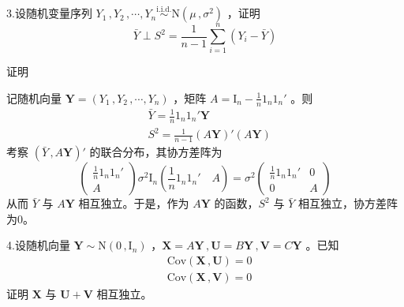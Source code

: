 \documentclass[12pt,hyperref,]{ctexart}
\begin{document}
\vspace{3em}

\kaishu

3.设随机变量序列
\(Y_1\, ,Y_2\, ,\cdots ,Y_n \overset{\mathrm{i.i.d.}}{\sim} \mathrm{N}(\mu\, ,\sigma^2)\)
，证明 \begin{equation*}
\bar{Y}\perp S^2=\frac{1}{n-1}\sum_{i=1}^n\left(Y_i-\bar{Y}\right)
\end{equation*}

\vspace{1em}

\heiti

证明

\songti

记随机向量 \(\boldsymbol{Y}=(Y_1\, ,Y_2\, ,\cdots ,Y_n)\) ，矩阵
\(A=\mathrm{I}_n-\frac 1n1_n1_n'\) 。则 \begin{equation*}
\begin{aligned}
& \bar{Y}=\frac 1n1_n1_n' \boldsymbol{Y} \\
& S^2=\frac{1}{n-1}(A\boldsymbol{Y})'(A\boldsymbol{Y})
\end{aligned}
\end{equation*}考察 \((\bar{Y}\, ,A\boldsymbol{Y})'\)
的联合分布，其协方差阵为 \begin{equation*}
\begin{pmatrix}
\frac 1n1_n1_n' \\
A
\end{pmatrix}\sigma^2\mathrm{I}_n\left(\frac 1n1_n1_n' \quad  A\right)=\sigma^2
\begin{pmatrix}
\frac 1n1_n1_n' & 0 \\
0 & A
\end{pmatrix}
\end{equation*}从而 \(\bar{Y}\) 与 \(A\boldsymbol{Y}\)
相互独立。于是，作为 \(A\boldsymbol{Y}\) 的函数，\(S^2\) 与 \(\bar{Y}\)
相互独立，协方差阵为0。

\vspace{3em}

\kaishu

4.设随机向量 \(\boldsymbol{Y}\sim\mathrm{N}(0\, ,\mathrm{I}_n)\)
，\(\boldsymbol{X}=A\boldsymbol{Y}\, ,\boldsymbol{U}=B\boldsymbol{Y}\, ,\boldsymbol{V}=C\boldsymbol{Y}\)
。已知 \begin{equation*}
\begin{aligned}
& \mathrm{Cov}(\boldsymbol{X}\, ,\boldsymbol{U})=0 \\
& \mathrm{Cov}(\boldsymbol{X}\, ,\boldsymbol{V})=0
\end{aligned}
\end{equation*}证明 \(\boldsymbol{X}\) 与
\(\boldsymbol{U}+\boldsymbol{V}\) 相互独立。
\end{document}
